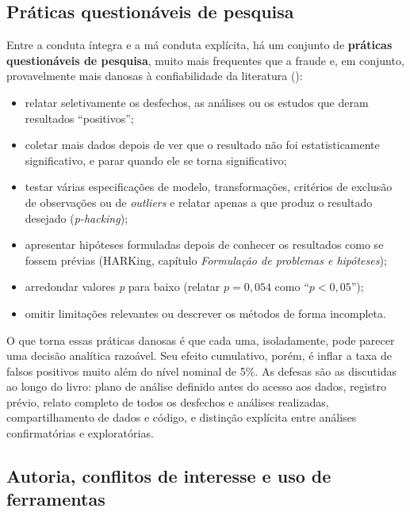 \documentclass[
]{book}
\providecommand{\tightlist}{%
  \setlength{\itemsep}{0pt}\setlength{\parskip}{0pt}}
\begin{document}
\subsection{Práticas questionáveis de pesquisa}\label{pruxe1ticas-questionuxe1veis-de-pesquisa}

Entre a conduta íntegra e a má conduta explícita, há um conjunto de \textbf{práticas questionáveis de pesquisa}, muito mais frequentes que a fraude e, em conjunto, provavelmente mais danosas à confiabilidade da literatura ():

\begin{itemize}
\tightlist
\item
  relatar seletivamente os desfechos, as análises ou os estudos que deram resultados ``positivos'';
\item
  coletar mais dados depois de ver que o resultado não foi estatisticamente significativo, e parar quando ele se torna significativo;
\item
  testar várias especificações de modelo, transformações, critérios de exclusão de observações ou de \emph{outliers} e relatar apenas a que produz o resultado desejado (\emph{p-hacking});
\item
  apresentar hipóteses formuladas depois de conhecer os resultados como se fossem prévias (HARKing, capítulo \emph{Formulação de problemas e hipóteses});
\item
  arredondar valores \emph{p} para baixo (relatar \(p = 0{,}054\) como ``\(p < 0{,}05\)'');
\item
  omitir limitações relevantes ou descrever os métodos de forma incompleta.
\end{itemize}

O que torna essas práticas danosas é que cada uma, isoladamente, pode parecer uma decisão analítica razoável. Seu efeito cumulativo, porém, é inflar a taxa de falsos positivos muito além do nível nominal de 5\%. As defesas são as discutidas ao longo do livro: plano de análise definido antes do acesso aos dados, registro prévio, relato completo de todos os desfechos e análises realizadas, compartilhamento de dados e código, e distinção explícita entre análises confirmatórias e exploratórias.

\subsection{Autoria, conflitos de interesse e uso de ferramentas}\label{autoria-conflitos-de-interesse-e-uso-de-ferramentas}
\end{document}
